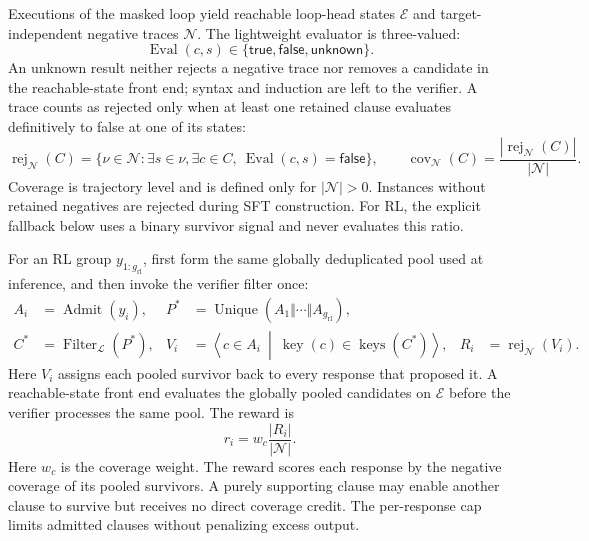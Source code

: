 Executions of the masked loop yield reachable loop-head states \(\mathcal E\)
and target-independent negative traces \(\mathcal N\).  The lightweight
evaluator is three-valued:
\begin{equation}
  \operatorname{Eval}(c,s)\in
  \{\mathsf{true},\mathsf{false},\mathsf{unknown}\}.
  \label{eq:formal-state-eval}
\end{equation}
An unknown result neither rejects a negative trace nor removes a candidate in
the reachable-state front end; syntax and induction are left to the verifier.
A trace counts as rejected only when at least one retained clause evaluates
definitively to false at one of its states:
\begin{equation}
  \operatorname{rej}_{\mathcal N}(C)
  =\{\nu\in\mathcal N:\exists s\in\nu,\exists c\in C,\
    \operatorname{Eval}(c,s)=\mathsf{false}\},
  \qquad
  \operatorname{cov}_{\mathcal N}(C)
  =\frac{|\operatorname{rej}_{\mathcal N}(C)|}{|\mathcal N|}.
  \label{eq:formal-coverage}
\end{equation}
Coverage is trajectory level and is defined only for
\(|\mathcal N|>0\).  Instances without retained negatives are rejected during
SFT construction.  For RL, the explicit fallback below uses a binary survivor
signal and never evaluates this ratio.

For an RL group \(y_{1:g_{\mathrm{rl}}}\), first form the same globally
deduplicated pool used at inference, and then invoke the verifier filter once:
\begin{align}
  A_i&=\operatorname{Admit}(y_i),
  &P^*&=\operatorname{Unique}\!\left(A_1\Vert\cdots\Vert A_{g_{\mathrm{rl}}}\right),
  \label{eq:formal-pooled-filter}\\
  C^*&=\operatorname{Filter}_{\mathcal L}(P^*),
  &V_i&=\left\langle c\in A_i\ \middle|\
    \operatorname{key}(c)\in\operatorname{keys}(C^*)\right\rangle,
  &R_i&=\operatorname{rej}_{\mathcal N}(V_i).
  \label{eq:formal-projection}
\end{align}
Here \(V_i\) assigns each pooled survivor back to every response that proposed
it.  A reachable-state front end evaluates the globally pooled candidates on
\(\mathcal E\) before the verifier processes the same pool.  The reward is
\begin{equation}
  r_i=w_c\frac{|R_i|}{|\mathcal N|}.
  \label{eq:formal-reward}
\end{equation}
Here \(w_c\) is the coverage weight.
The reward scores each response by the negative coverage of its pooled
survivors.  A purely supporting clause may enable another clause to survive
but receives no direct coverage credit.  The per-response cap limits
admitted clauses without penalizing excess output.

